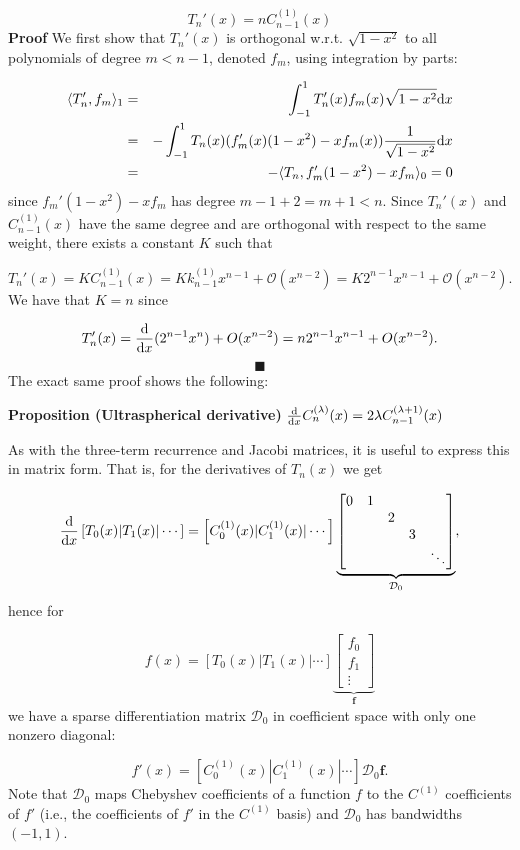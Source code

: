 \documentclass[12pt,landscape]{article}
\begin{document}
{\[
T_n'(x) = n C^{(1)}_{n-1}(x)
\]
\textbf{Proof} We first show that $T_n'(x)$ is orthogonal w.r.t. $\sqrt{1-x^2}$ to all  polynomials of degree $m < n-1$, denoted $f_m$, using integration by parts:


\begin{eqnarray*}
\langle T_n',f_m\rangle_{1} &=& \int_{-1}^1 T_n'(x) f_m(x) \sqrt{1-x^2} {\rm d}x \\
&=& -\int_{-1}^1 T_n(x) (f_m'(x)(1-x^2) - xf_m(x)) {1  \over \sqrt{1-x^2}} {\rm d}x  \\ 
&=& - \langle T_n, f_m'(1-x^2) - x f_m \rangle_{0}  = 0
\end{eqnarray*}
since $f_m'(1-x^2) - x f_m $ has degree $m-1 +2 = m+1 < n$.  Since $T_n'(x)$ and $C^{(1)}_{n-1}(x)$ have the same degree and are orthogonal with respect to the same weight, there exists a constant $K$ such that 

\[
T_n'(x) = KC^{(1)}_{n-1}(x) = K k_{n-1}^{(1)}x^{n-1} + \mathcal{O}(x^{n-2})= K 2^{n-1}x^{n-1} + \mathcal{O}(x^{n-2}).
\]
We have that $K = n$ since

\[
T_n'(x) = {{\rm d} \over {\rm d}x} (2^{n-1} x^n)  + O(x^{n-2}) = n 2^{n-1} x^{n-1} + O(x^{n-2}).
\]
\[
\blacksquare
\]
The exact same proof shows the following:

\textbf{Proposition (Ultraspherical derivative)} ${{\rm d} \over {\rm d}x} C_n^{(\lambda)}(x) = 2 \lambda  C_{n-1}^{(\lambda+1)}(x)$

As with the three-term recurrence and Jacobi matrices, it is useful to express this in matrix form. That is, for the derivatives of $T_n(x)$ we get

\[
{{\rm d} \over {\rm d}x}\left[T_0(x) | T_1(x) | \cdots \right] = \left[C_0^{(1)}(x) | C_1^{(1)}(x) | \cdots \right]\underbrace{\begin{bmatrix}
0 & 1 \cr
&& 2 \cr
&&& 3 \cr
&&&&\ddots
\end{bmatrix}}_{\mathcal{D}_0},
\]
hence for 

\[
f(x) = \left[T_0(x) | T_1(x) | \cdots \right] \underbrace{\begin{bmatrix} f_0\\f_1\\\vdots \end{bmatrix}}_{\mathbf{f}}
\]
we have a sparse differentiation matrix $\mathcal{D}_0$ in coefficient space with only one nonzero diagonal: 

\[
f'(x) = \left[C_0^{(1)}(x) | C_1^{(1)}(x) | \cdots \right]\mathcal{D}_0\mathbf{f}.
\]
Note that $\mathcal{D}_0$ maps Chebyshev coefficients of a function $f$ to the $C^{(1)}$ coefficients of $f'$ (i.e., the coefficients of $f'$ in the $C^{(1)}$ basis) and $\mathcal{D}_0$ has bandwidths $(-1, 1)$.

}
\end{document}
